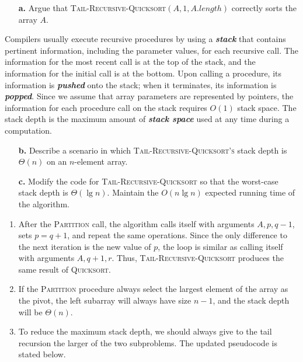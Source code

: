 \documentclass{report}
\makeatletter
\renewenvironment{framed}{%
 \def\FrameCommand##1{\hskip\@totalleftmargin
 \fboxsep=\FrameSep\fbox{##1}}%
 \MakeFramed {\advance\hsize-\width
   \@totalleftmargin\z@ \linewidth\hsize
   \@setminipage}}%
 {\par\unskip\endMakeFramed}
\makeatother
\begin{document}
\begin{enumerate}
{\begin{enumerate}
\item[\textbf{a.}]{Argue that \textsc{Tail-Recursive-Quicksort}$(A, 1,
A.length)$ correctly sorts the array $A$.}
\end{enumerate}

Compilers usually execute recursive procedures by using a \textbf{\emph{stack}}
that contains pertinent information, including the parameter values, for each
recursive call. The information for the most recent call is at the top of the
stack, and the information for the initial call is at the bottom. Upon calling
a procedure, its information is \textbf{\emph{pushed}} onto the stack; when it
terminates, its information is \textbf{\emph{popped}}. Since we assume that
array parameters are represented by pointers, the information for each procedure
call on the stack requires $O(1)$ stack space. The stack depth is the maximum
amount of \textbf{\emph{stack space}} used at any time during a computation.

\begin{enumerate}
\item[\textbf{b.}]{Describe a scenario in which
\textsc{Tail-Recursive-Quicksort's} stack depth is $\Theta(n)$ on an
$n$-element array.}

\item[\textbf{c.}]{Modify the code for \textsc{Tail-Recursive-Quicksort} so that
the worst-case stack depth is $\Theta(\lg n)$. Maintain the $O(n \lg n)$
expected running time of the algorithm.}
\end{enumerate}
}

\begin{framed}
\begin{enumerate}
\item{After the \textsc{Partition} call, the algorithm calls itself with
arguments $A, p, q - 1$, sets $p = q + 1$, and repeat the same operations. Since
the only difference to the next iteration is the new value of $p$, the loop
is similar as calling itself with arguments $A, q + 1, r$. Thus,
\textsc{Tail-Recursive-Quicksort}} produces the same result of
\textsc{Quicksort}.
\item{If the \textsc{Partition} procedure always select the largest element of
the array as the pivot, the left subarray will always have size $n - 1$, and the
stack depth will be $\Theta(n)$.}
\item{To reduce the maximum stack depth, we should always give to the tail
recursion the larger of the two subproblems. The updated pseudocode is stated
below.

}
\end{enumerate}
\end{framed}
\end{enumerate}
\end{document}
